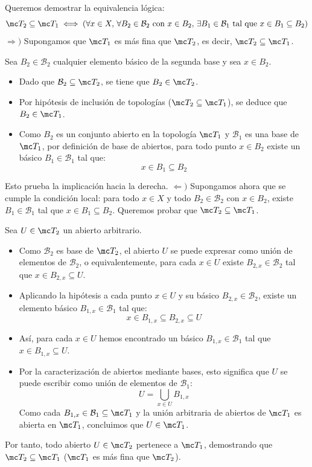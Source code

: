 \begin{sol}
    Queremos demostrar la equivalencia lógica:
    \[
        \mc T_2 \subseteq \mc T_1 \iff \left( \forall x \in X, \, \forall B_2 \in \mathcal{B}_2 \text{ con } x \in B_2, \, \exists B_1 \in \mathcal{B}_1 \text{ tal que } x \in B_1 \subseteq B_2 \right)
    \]
    $\Rightarrow)$ Supongamos que $\mc T_1$ es más fina que $\mc T_2$, es decir, $\mc T_2 \subseteq \mc T_1$.
    
    Sea $B_2 \in \mathcal{B}_2$ cualquier elemento básico de la segunda base y sea $x \in B_2$.
    \begin{itemize}
        \item Dado que $\mathcal{B}_2 \subseteq \mc T_2$, se tiene que $B_2 \in \mc T_2$.
        \item Por hipótesis de inclusión de topologías ($\mc T_2 \subseteq \mc T_1$), se deduce que $B_2 \in \mc T_1$.
        \item Como $B_2$ es un conjunto abierto en la topología $\mc T_1$ y $\mathcal{B}_1$ es una base de $\mc T_1$, por definición de base de abiertos, para todo punto $x \in B_2$ existe un básico $B_1 \in \mathcal{B}_1$ tal que:
        \[
            x \in B_1 \subseteq B_2
        \]
    \end{itemize}
    Esto prueba la implicación hacia la derecha.
    $\Leftarrow)$ Supongamos ahora que se cumple la condición local: para todo $x \in X$ y todo $B_2 \in \mathcal{B}_2$ con $x \in B_2$, existe $B_1 \in \mathcal{B}_1$ tal que $x \in B_1 \subseteq B_2$. Queremos probar que $\mc T_2 \subseteq \mc T_1$.

    Sea $U \in \mc T_2$ un abierto arbitrario.
    \begin{itemize}
        \item Como $\mathcal{B}_2$ es base de $\mc T_2$, el abierto $U$ se puede expresar como unión de elementos de $\mathcal{B}_2$, o equivalentemente, para cada $x \in U$ existe $B_{2, x} \in \mathcal{B}_2$ tal que $x \in B_{2, x} \subseteq U$.
        \item Aplicando la hipótesis a cada punto $x \in U$ y su básico $B_{2, x} \in \mathcal{B}_2$, existe un elemento básico $B_{1, x} \in \mathcal{B}_1$ tal que:
        \[
            x \in B_{1, x} \subseteq B_{2, x} \subseteq U
        \]
        \item Así, para cada $x \in U$ hemos encontrado un básico $B_{1, x} \in \mathcal{B}_1$ tal que $x \in B_{1, x} \subseteq U$.
        \item Por la caracterización de abiertos mediante bases, esto significa que $U$ se puede escribir como unión de elementos de $\mathcal{B}_1$:
        \[
            U = \bigcup_{x \in U} B_{1, x}
        \]
        Como cada $B_{1, x} \in \mathcal{B}_1 \subseteq \mc T_1$ y la unión arbitraria de abiertos de $\mc T_1$ es abierta en $\mc T_1$, concluimos que $U \in \mc T_1$.
    \end{itemize}

    Por tanto, todo abierto $U \in \mc T_2$ pertenece a $\mc T_1$, demostrando que $\mc T_2 \subseteq \mc T_1$ ($\mc T_1$ es más fina que $\mc T_2$).
\end{sol}
